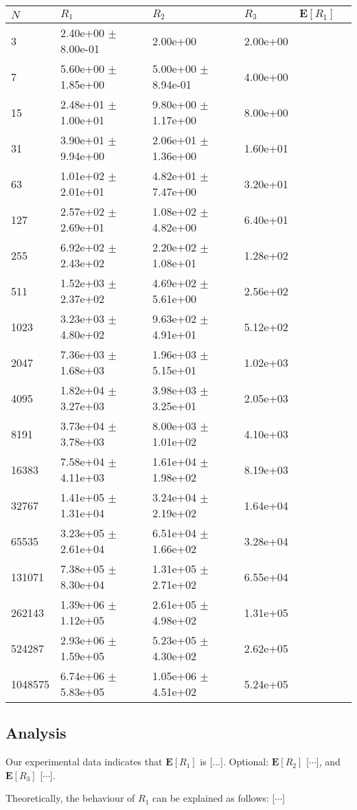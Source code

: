 \documentclass{tufte-handout}
\begin{document}
\medskip\noindent
\begin{tabular}{ l l l l l l }
\toprule
 { $N$ } & { $R_1$ } & {$R_2$} & {$R_3$} & {$\mathbf E[R_1]$}\\\midrule
3 & 2.40e+00 $\pm$ 8.00e-01 & 2.00e+00 & 2.00e+00 & \\
7 & 5.60e+00 $\pm$ 1.85e+00 & 5.00e+00 $\pm$ 8.94e-01 & 4.00e+00 & \\
15 & 2.48e+01 $\pm$ 1.00e+01 & 9.80e+00 $\pm$ 1.17e+00 & 8.00e+00 & \\
31 & 3.90e+01 $\pm$ 9.94e+00 & 2.06e+01 $\pm$ 1.36e+00 & 1.60e+01 & \\
63 & 1.01e+02 $\pm$ 2.01e+01 & 4.82e+01 $\pm$ 7.47e+00 & 3.20e+01 & \\
127 & 2.57e+02 $\pm$ 2.69e+01 & 1.08e+02 $\pm$ 4.82e+00 & 6.40e+01 & \\
255 & 6.92e+02 $\pm$ 2.43e+02 & 2.20e+02 $\pm$ 1.08e+01 & 1.28e+02 & \\
511 & 1.52e+03 $\pm$ 2.37e+02 & 4.69e+02 $\pm$ 5.61e+00 & 2.56e+02 & \\
1023 & 3.23e+03 $\pm$ 4.80e+02 & 9.63e+02 $\pm$ 4.91e+01 & 5.12e+02 & \\
2047 & 7.36e+03 $\pm$ 1.68e+03 & 1.96e+03 $\pm$ 5.15e+01 & 1.02e+03 & \\
4095 & 1.82e+04 $\pm$ 3.27e+03 & 3.98e+03 $\pm$ 3.25e+01 & 2.05e+03 & \\
8191 & 3.73e+04 $\pm$ 3.78e+03 & 8.00e+03 $\pm$ 1.01e+02 & 4.10e+03 & \\
16383 & 7.58e+04 $\pm$ 4.11e+03 & 1.61e+04 $\pm$ 1.98e+02 & 8.19e+03 & \\
32767 & 1.41e+05 $\pm$ 1.31e+04 & 3.24e+04 $\pm$ 2.19e+02 & 1.64e+04 & \\
65535 & 3.23e+05 $\pm$ 2.61e+04 & 6.51e+04 $\pm$ 1.66e+02 & 3.28e+04 & \\
131071 & 7.38e+05 $\pm$ 8.30e+04 & 1.31e+05 $\pm$ 2.71e+02 & 6.55e+04 & \\
262143 & 1.39e+06 $\pm$ 1.12e+05 & 2.61e+05 $\pm$ 4.98e+02 & 1.31e+05 & \\
524287 & 2.93e+06 $\pm$ 1.59e+05 & 5.23e+05 $\pm$ 4.30e+02 & 2.62e+05 & \\
1048575 & 6.74e+06 $\pm$ 5.83e+05 & 1.05e+06 $\pm$ 4.51e+02 & 5.24e+05 & \\
\bottomrule
\end{tabular}

\subsection{Analysis}

Our experimental data indicates that $\mathbf E [R_1]$ is [$\ldots$]. Optional:
$\mathbf E[R_2]$ [$\cdots$], and $\mathbf E[R_3]$ [$\cdots$].

Theoretically, the behaviour of $R_1$ can be explained as follows: [$\cdots$]
\end{document}
